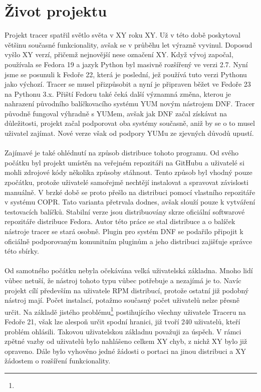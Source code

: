 \documentclass[
  field=inf,
  biblatex,
  glossaries,
  index
]{kidiplom}
\begin{document}
\section{Život projektu}
Projekt tracer spatřil světlo světa v XY roku XY. Už v této době poskytoval většinu současné funkcionality, avšak se v průběhu let výrazně vyvinul. Doposud vyšlo XY verzí, přičemž nejnovější nese označení XY. Když vývoj započal, používala se Fedora 19 a jazyk Python byl masivně rozšířený ve verzi 2.7. Nyní jsme se posunuli k Fedoře 22, která je poslední, jež používá tuto verzi Pythonu jako výchozí. Tracer se musel přizpůsobit a nyní je připraven běžet ve Fedoře 23 na Pythonu 3.x. Přiští Fedoru také čeká další významná změna, kterou je nahrazení původního balíčkovacího systému YUM novým nástrojem DNF. Tracer původně fungoval výhradně s YUMem, avšak jak DNF začal získávat na důležitosti, projekt začal podporovat oba systémy současně, aniž by se o to musel uživatel zajímat. Nové verze však od podpory YUMu ze zjevných důvodů upustí.
\\
\\
Zajímavé je také ohlédnutí na způsob distribuce tohoto programu. Od svého počátku byl projekt umístěn na veřejném repozitáři na GitHubu a uživatelé si mohli zdrojové kódy několika způsoby stáhnout. Tento způsob byl vhodný pouze zpočátku, protože uživatelé samořejmě nechtějí instalovat a spravovat závislosti manuálně. V brzké době se proto přešlo na distribuci pomocí vlastního repozitáře v systému COPR. Tato varianta přetrvala dodnes, avšak slouží pouze k vytváření testovacích balíčků. Stabilní verze jsou distribuovány skrze oficiální softwarové repozitáře distribuce Fedora. Autor této práce se stal  distribuce a o balíček nástroje tracer se stará osobně. Plugin pro systém DNF se podařilo připojit k oficiálně podporovaným komunitním pluginům a jeho distribuci zajišťuje správce této sbírky.
\\
\\
Od samotného počátku nebyla očekávána velká uživatelská základna. Mnoho lidí vůbec netuší, že nástroj tohoto typu vůbec potřebuje a nezajímá je to. Navíc projekt cílí především na uživatele RPM distribucí, protože ostatní již podobný nástroj mají. Počet instalací, potažmo současný počet uživatelů nelze přesně určit. Na základě jistého problému\footnote{} postihujícího všechny uživatele Traceru na Fedoře 21, však lze alespoň určit spodní hranici, již tvoří 240 uživatelů, kteří problém ohlásili. Takovou uživatelskou základnu považuji za úspěch. V rámci zpětné vazby od uživatelů bylo nahlášeno celkem XY chyb, z nichž XY bylo již opraveno. Dále bylo vyhověno jedné žádosti o portaci na jinou distribuci a XY žádostem o rozšíření funkcionality.
\end{document}
